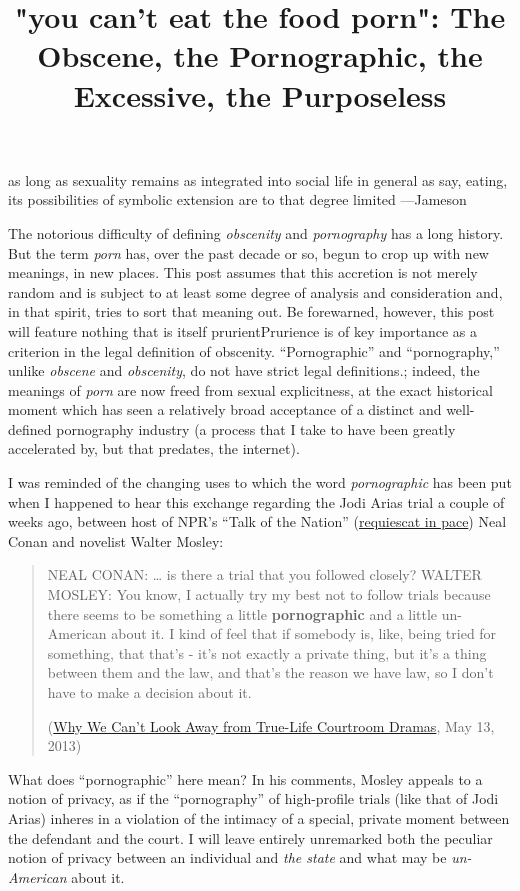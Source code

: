 \documentclass[
  12pt,
]{article}
\title{"you can't eat the food porn": The Obscene, the Pornographic, the
Excessive, the Purposeless}
\author{}
\date{}
\begin{document}
as long as sexuality remains as integrated into social life in general
as say, eating, its possibilities of symbolic extension are to that
degree limited ---Jameson

The notorious difficulty of defining \emph{obscenity} and
\emph{pornography} has a long history. But the term \emph{porn} has,
over the past decade or so, begun to crop up with new meanings, in new
places. This post assumes that this accretion is not merely random and
is subject to at least some degree of analysis and consideration and, in
that spirit, tries to sort that meaning out. Be forewarned, however,
this post will feature nothing that is itself prurient{Prurience is of
key importance as a criterion in the legal definition of obscenity.
``Pornographic'' and ``pornography,'' unlike \emph{obscene} and
\emph{obscenity}, do not have strict legal definitions.}; indeed, the
meanings of \emph{porn} are now freed from sexual explicitness, at the
exact historical moment which has seen a relatively broad acceptance of
a distinct and well-defined pornography industry (a process that I take
to have been greatly accelerated by, but that predates, the internet).

I was reminded of the changing uses to which the word
\emph{pornographic} has been put when I happened to hear this exchange
regarding the Jodi Arias trial a couple of weeks ago, between host of
NPR's ``Talk of the Nation''
(\href{http://www.nytimes.com/2013/03/30/business/media/npr-to-end-talk-of-the-nation.html?_r=0}{requiescat
in pace}) Neal Conan and novelist Walter Mosley:

\begin{quote}
NEAL CONAN: \ldots{} is there a trial that you followed closely? WALTER
MOSLEY: You know, I actually try my best not to follow trials because
there seems to be something a little \textbf{pornographic} and a little
un-American about it. I kind of feel that if somebody is, like, being
tried for something, that that's - it's not exactly a private thing, but
it's a thing between them and the law, and that's the reason we have
law, so I don't have to make a decision about it.

(\href{http://www.lexisnexis.com/lnacui2api/api/version1/getDocCui?lni=58DH-PDP1-DY2S-N0JM\&csi=8398\&hl=t\&hv=t\&hnsd=f\&hns=t\&hgn=t\&oc=00240\&perma=true}{Why
We Can't Look Away from True-Life Courtroom Dramas}, May 13, 2013)
\end{quote}

What does ``pornographic'' here mean? In his comments, Mosley appeals to
a notion of privacy, as if the ``pornography'' of high-profile trials
(like that of Jodi Arias) inheres in a violation of the intimacy of a
special, private moment between the defendant and the court. {I will
leave entirely unremarked both the peculiar notion of privacy between an
individual and \emph{the state} and what may be \emph{un-American} about
it.}
\end{document}

